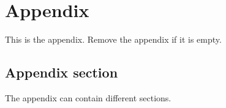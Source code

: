 \chapter{Appendix}
\label{chap:appendix}

This is the appendix.
Remove the appendix if it is empty.

\section{Appendix section}

The appendix can contain different sections.
